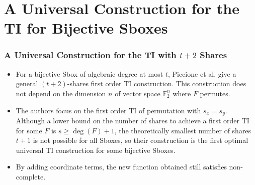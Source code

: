 \documentclass[
    aspectratio=169,                   %
]{beamer}
\newcommand{\F}{\mathbb{F}}
\begin{document}
    

\section{A Universal Construction for the TI for Bijective Sboxes} 
    \begin{frame}
        \frametitle{A Universal Construction for the TI with $ t + 2 $ Shares}
    
        \begin{itemize}
            \item For a bijective Sbox of algebraic degree at most $ t $, Piccione et al. give a general $ (t+2) $-shares first order TI construction.  
            This construction does not depend on the dimension $ n $ of vector space $ \F_2^n $ where $ F $ permutes. 
            \item The authors focus on the first order TI of permutation with $ s_x=s_y $. 
            Although a lower bound on the number of shares to achieve a  first order TI for some $ F $ is $ s\ge\deg(F)+1 $, 
            the theoretically smallest number of shares $ t + 1 $ is not possible for all Sboxes, 
            so their construction is the first optimal universal TI construction for some bijective Sboxes. 
            \item By adding coordinate terms, the new function obtained still satisfies non-complete.
        \end{itemize}
    \end{frame}
\end{document}
